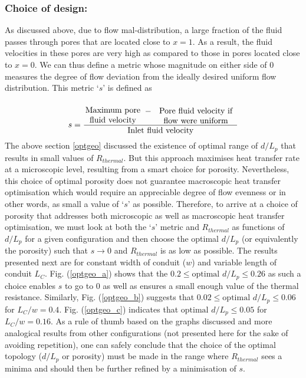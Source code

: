 \documentclass[twocolumn,10pt,cleanfoot]{ihmtc}
\begin{document}
\subsubsection*{Choice of design:} As discussed above, due to flow mal-distribution, a large fraction of the fluid passes through pores that are located close to $x=1$. As a result, the fluid velocities in these pores are very high as compared to those in pores located close to $x=0$. We can thus define a metric whose magnitude on either side of 0 measures the degree of flow deviation from the ideally desired uniform flow distribution. This metric `$ s $' is defined as
%
\[s = \frac{\parbox{7em}{\center{Maximum pore fluid velocity}}\,-\,\parbox{10em}{\center{Pore fluid velocity if flow were uniform}}}{\text{Inlet fluid velocity}}\]
%
The above section \ref{optgeo} discussed the existence of optimal range of $d/L_p$ that results in small values of $R_{thermal}$. But this approach maximises heat transfer rate at a microscopic level, resulting from a smart choice for porosity. Nevertheless, this choice of optimal porosity does not guarantee macroscopic heat transfer optimisation which would require an appreciable degree of flow evenness or in other words, as small a value of `$s$' as possible. Therefore, to arrive at a choice of porosity that addresses both microscopic as well as macroscopic heat transfer optimisation, we must look at both the `$s$' metric and $R_{thermal}$ as functions of $d/L_p$ for a given configuration and then choose the optimal $d/L_p$ (or equivalently the porosity) such that $s\rightarrow 0 $ and  $R_{thermal}$ is as low as possible. The results presented next are for constant width of conduit ($w$) and variable length of conduit $L_C$.
%
Fig. (\ref{optgeo_a}) shows that the $0.2 \leq \text{optimal } d/L_p \leq 0.26$ as such a choice enables $s$ to go to 0 as well as ensures a small enough value of the thermal resistance. Similarly, Fig. (\ref{optgeo_b}) suggests that $0.02 \leq \text{optimal } d/L_p \leq 0.06$ for $L_C/w=0.4$. Fig. (\ref{optgeo_c}) indicates that  $\text{optimal }d/L_p \leq 0.05$ for $L_C/w=0.16$. As a rule of thumb based on the graphs discussed and more analogical results from other configurations (not presented here for the sake of avoiding repetition), one can safely conclude that the choice of the optimal topology ($d/L_p$ or porosity) must be made in the range where $R_{thermal}$ sees a minima and should then be further refined by a minimisation of $s$.
%
\end{document}

